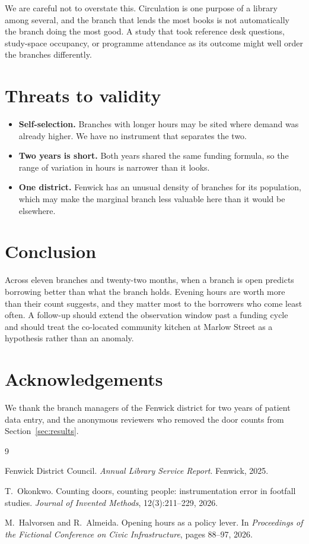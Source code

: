 \documentclass[11pt,a4paper]{article}
\begin{document}
We are careful not to overstate this. Circulation is one purpose of a library
among several, and the branch that lends the most books is not automatically the
branch doing the most good. A study that took reference desk questions,
study-space occupancy, or programme attendance as its outcome might well order
the branches differently.

\section{Threats to validity}

\begin{itemize}
  \item \textbf{Self-selection.} Branches with longer hours may be sited where
        demand was already higher. We have no instrument that separates the two.
  \item \textbf{Two years is short.} Both years shared the same funding formula,
        so the range of variation in hours is narrower than it looks.
  \item \textbf{One district.} Fenwick has an unusual density of branches for
        its population, which may make the marginal branch less valuable here
        than it would be elsewhere.
\end{itemize}

\section{Conclusion}
\label{sec:conclusion}

Across eleven branches and twenty-two months, when a branch is open predicts
borrowing better than what the branch holds. Evening hours are worth more than
their count suggests, and they matter most to the borrowers who come least
often. A follow-up should extend the observation window past a funding cycle and
should treat the co-located community kitchen at Marlow Street as a hypothesis
rather than an anomaly.

\section*{Acknowledgements}

We thank the branch managers of the Fenwick district for two years of patient
data entry, and the anonymous reviewers who removed the door counts from
Section~\ref{sec:results}.

\begin{thebibliography}{9}

Fenwick District Council.
\newblock \emph{Annual Library Service Report}.
\newblock Fenwick, 2025.

T.~Okonkwo.
\newblock Counting doors, counting people: instrumentation error in footfall
studies.
\newblock \emph{Journal of Invented Methods}, 12(3):211--229, 2026.

M.~Halvorsen and R.~Almeida.
\newblock Opening hours as a policy lever.
\newblock In \emph{Proceedings of the Fictional Conference on Civic
Infrastructure}, pages 88--97, 2026.

\end{thebibliography}
\end{document}
